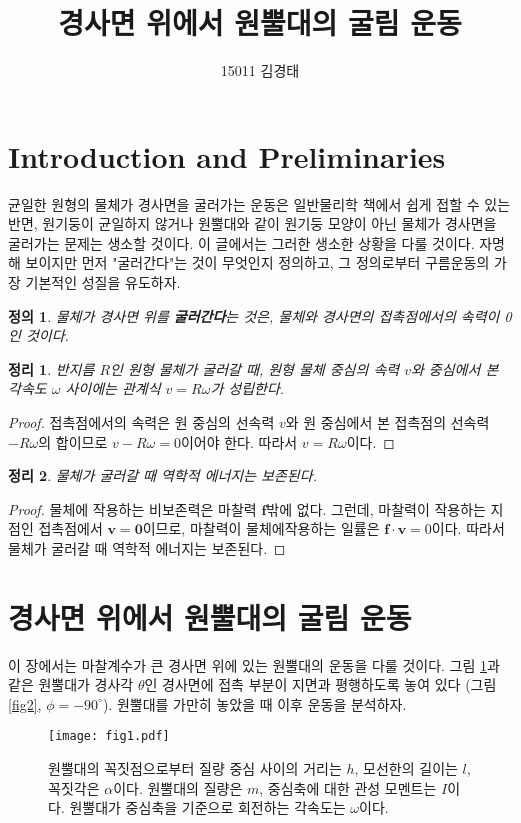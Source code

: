 \documentclass[11pt]{article}
\title{경사면 위에서 원뿔대의 굴림 운동}
\author{15011 김경태}
\newtheorem{aaa}{정리}
\newtheorem{bbb}{정의}
\begin{document}
\maketitle
	\section{Introduction and Preliminaries}
	균일한 원형의 물체가 경사면을 굴러가는 운동은 일반물리학 책에서 쉽게 접할 수 있는 반면, 원기둥이 균일하지 않거나 원뿔대와 같이 원기둥 모양이 아닌 물체가 경사면을 굴러가는 문제는 생소할 것이다. 이 글에서는 그러한 생소한 상황을 다룰 것이다. 자명해 보이지만 먼저 "굴러간다"는 것이 무엇인지 정의하고, 그 정의로부터 구름운동의 가장 기본적인 성질을 유도하자.
	
	\begin{bbb}
		물체가 경사면 위를 \textbf{굴러간다}는 것은, 물체와 경사면의 접촉점에서의 속력이 0인 것이다.
	\end{bbb}
\begin{aaa}
	반지름 $R$인 원형 물체가 굴러갈 때, 원형 물체 중심의 속력 $v$와 중심에서 본 각속도 $\omega$ 사이에는 관계식 $v=R\omega$가 성립한다.
\end{aaa}
\begin{proof}
	접촉점에서의 속력은 원 중심의 선속력 $v$와 원 중심에서 본 접촉점의 선속력 $-R\omega$의 합이므로 $v-R\omega=0$이어야 한다. 따라서 $v=R\omega$이다. 
\end{proof}
\begin{aaa}
	물체가 굴러갈 때 역학적 에너지는 보존된다.
\end{aaa}
\begin{proof}
	물체에 작용하는 비보존력은 마찰력 $\mathbf{f}$밖에 없다. 그런데, 마찰력이 작용하는 지점인 접촉점에서 $\mathbf{v}=\mathbf{0}$이므로, 마찰력이 물체에작용하는 일률은 $\mathbf{f} \cdot \mathbf{v}=0$이다. 따라서 물체가 굴러갈 때 역학적 에너지는 보존된다.
\end{proof}

\section{경사면 위에서 원뿔대의 굴림 운동}
  

  
  이 장에서는 마찰계수가 큰 경사면 위에 있는 원뿔대의 운동을 다룰 것이다. 그림 \ref{fig1}과 같은 원뿔대가 경사각 $\theta$인 경사면에 접촉 부분이 지면과 평행하도록 놓여 있다 (그림 \ref{fig2}, $\phi=-90^\circ$). 원뿔대를 가만히 놓았을 때 이후 운동을 분석하자.
 \begin{figure}[h]
 \centering
\texttt{[image: fig1.pdf]}
\caption{원뿔대의 꼭짓점으로부터 질량 중심 사이의 거리는 $h$, 모선한의 길이는 $l$, 꼭짓각은 $\alpha$이다. 원뿔대의 질량은 $m$, 중심축에 대한 관성 모멘트는 $I$이다. 원뿔대가 중심축을 기준으로 회전하는 각속도는 $\omega$이다.}
\label{fig1}
\end{figure}
\end{document}
